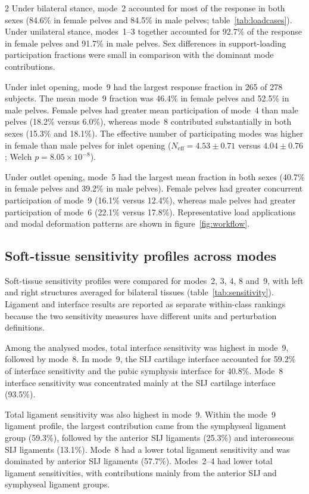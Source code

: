 \documentclass[openacc]{rsproca_new}
\begin{document}
\begin{multicols}{2}
Under bilateral stance, mode~2 accounted for most of the response in both sexes (84.6\% in female pelves and 84.5\% in male pelves; table~\ref{tab:loadcases}). Under unilateral stance, modes~1--3 together accounted for 92.7\% of the response in female pelves and 91.7\% in male pelves. Sex differences in support-loading participation fractions were small in comparison with the dominant mode contributions.

Under inlet opening, mode~9 had the largest response fraction in 265 of 278 subjects. The mean mode~9 fraction was 46.4\% in female pelves and 52.5\% in male pelves. Female pelves had greater mean participation of mode~4 than male pelves (18.2\% versus 6.0\%), whereas mode~8 contributed substantially in both sexes (15.3\% and 18.1\%). The effective number of participating modes was higher in female than male pelves for inlet opening ($N_{\mathrm{eff}}=4.53\pm0.71$ versus $4.04\pm0.76$; Welch $p=8.05\times10^{-8}$).

Under outlet opening, mode~5 had the largest mean fraction in both sexes (40.7\% in female pelves and 39.2\% in male pelves). Female pelves had greater concurrent participation of mode~9 (16.1\% versus 12.4\%), whereas male pelves had greater participation of mode~6 (22.1\% versus 17.8\%). Representative load applications and modal deformation patterns are shown in figure~\ref{fig:workflow}.

\subsection{Soft-tissue sensitivity profiles across modes}

Soft-tissue sensitivity profiles were compared for modes~2, 3, 4, 8 and~9, with left and right structures averaged for bilateral tissues (table~\ref{tab:sensitivity}). Ligament and interface results are reported as separate within-class rankings because the two sensitivity measures have different units and perturbation definitions.

Among the analysed modes, total interface sensitivity was highest in mode~9, followed by mode~8. In mode~9, the SIJ cartilage interface accounted for 59.2\% of interface sensitivity and the pubic symphysis interface for 40.8\%. Mode~8 interface sensitivity was concentrated mainly at the SIJ cartilage interface (93.5\%).

Total ligament sensitivity was also highest in mode~9. Within the mode~9 ligament profile, the largest contribution came from the symphyseal ligament group (59.3\%), followed by the anterior SIJ ligaments (25.3\%) and interosseous SIJ ligaments (13.1\%). Mode~8 had a lower total ligament sensitivity and was dominated by anterior SIJ ligaments (57.7\%). Modes~2--4 had lower total ligament sensitivities, with contributions mainly from the anterior SIJ and symphyseal ligament groups.


\end{multicols}
\end{document}
